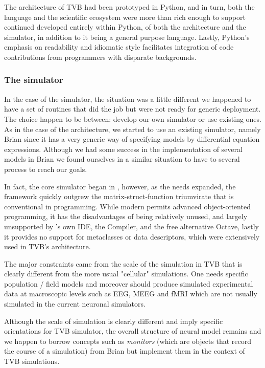The architecture of TVB had been prototyped in Python, and in turn, both the
language and the scientific ecosystem were more than rich enough to support
continued developed entirely within Python, of both the architecture and the
simulator, in addition to it being a general purpose language. Lastly, Python's
emphasis on readability and idiomatic style facilitates integration of 
code contributions from programmers with disparate backgrounds.


\subsubsection{The simulator}

In the case of the simulator, the situation was a little different we happened to
have a set of \matlab{} routines that did the job but were not ready for generic
deployment. The choice happen to be between: develop our own simulator or use
existing ones. As in the case of the architecture, we started to use an existing
simulator, namely Brian  since it has a very generic way of
specifying models by differential equation expressions. Although we had some
success in the implementation of several models in Brian we found ourselves in a
similar situation to have to  several process to reach our
goals. 

In fact, the core simulator began in \matlab{}, however, as the needs 
expanded, the framework quickly 
outgrew the matrix-struct-function triumvirate that is conventional
in \matlab{} programming. While modern \matlab{} permits advanced object-oriented
programming, it has the disadvantages of being relatively unused, and
largely unsupported by \matlab{}'s own IDE, the \matlab{} Compiler, and the free
alternative Octave, lastly it provides no support for metaclasses or data
descriptors, which were extensively used in TVB's architecture.

The major constraints came from the scale of the simulation in TVB that is
clearly different from the more usual "cellular" simulations. One needs specific
population / field models and moreover should produce simulated experimental
data at macroscopic levels such as EEG, MEEG and fMRI which are not usually
simulated in the current neuronal simulators.

Although the scale of simulation is clearly different and imply specific
orientations for TVB simulator, the overall structure of neural model remains
and we happen to borrow concepts such as \emph{monitors} (which are objects that
record the course of a simulation) from Brian but
implement them in the context of TVB simulations.


